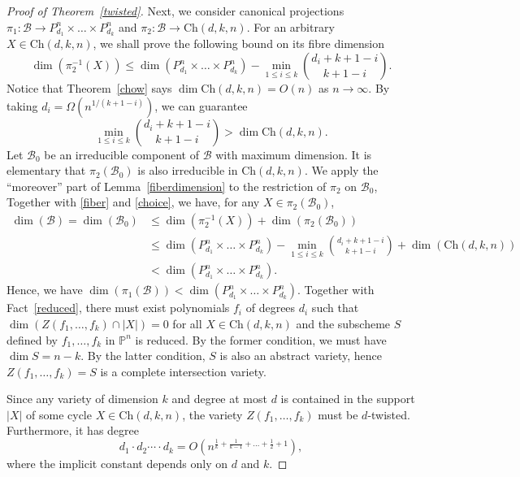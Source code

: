 \documentclass[11pt]{article}
\theoremstyle{definition}
\begin{document}
\begin{proof}[Proof of Theorem~\ref{twisted}]
    Next, we consider canonical projections $\pi_1: \mathcal{B} \to P^{n}_{d_1}\times\dots\times P^n_{d_k}$ and $\pi_2: \mathcal{B} \to \text{Ch}(d,k,n)$. For an arbitrary
    $X \in \text{Ch}(d,k,n)$, we shall prove the following bound on its fibre dimension \begin{equation}\label{fiber}
        \dim \left(\pi_2^{-1}(X)\right) \leq \dim\left( P^{n}_{d_1}\times\dots\times P^n_{d_k} \right) - \min_{1\leq i\leq k} \binom{d_i+k+1-i}{k+1-i}.
    \end{equation} Notice that Theorem~\ref{chow} says $\dim \text{Ch}(d,k,n) = O(n)$ as $n\to \infty$. By taking $d_i = \Omega\left(n^{1/(k+1-i)}\right)$, we can guarantee \begin{equation}\label{choice}
        \min_{1\leq i\leq k} \binom{d_i+k+1-i}{k+1-i} > \dim \text{Ch}(d,k,n).
    \end{equation} Let $\mathcal{B}_0$ be an irreducible component of $\mathcal{B}$ with maximum dimension. It is elementary that $\pi_2(\mathcal{B}_0)$ is also irreducible in $\text{Ch}(d,k,n)$. We apply the ``moreover'' part of Lemma~\ref{fiberdimension} to the restriction of $\pi_2$ on $\mathcal{B}_0$, Together with \eqref{fiber} and \eqref{choice}, we have, for any $X\in \pi_2(\mathcal{B}_0)$, \begin{align*}
        \dim(\mathcal{B}) = \dim(\mathcal{B}_0) &\leq \dim (\pi_2^{-1}(X))+\dim (\pi_2(\mathcal{B}_0))\\
                        &\leq \dim\left( P^{n}_{d_1}\times\dots\times P^n_{d_k} \right) - \min_{1\leq i\leq k} \binom{d_i+k+1-i}{k+1-i} + \dim (\text{Ch}(d,k,n))\\
                        &< \dim\left( P^{n}_{d_1}\times\dots\times P^n_{d_k} \right).
    \end{align*} Hence, we have $\dim\left(\pi_1(\mathcal{B})\right) < \dim ( P^{n}_{d_1}\times\dots\times P^n_{d_k} )$. Together with Fact~\ref{reduced}, there must exist polynomials $f_i$ of degrees $d_i$ such that $\dim ( Z(f_1,\dots,f_k) \cap |X| ) = 0$ for all $X \in \text{Ch}(d,k,n)$ and the subscheme $S$ defined by $f_1,\dots,f_k$ in $\mathbb{P}^n$ is reduced. By the former condition, we must have $\dim S = n - k$. By the latter condition, $S$ is also an abstract variety, hence $Z(f_1,\dots,f_k) = S$ is a complete intersection variety.
    
    Since any variety of dimension $k$ and degree at most $d$ is contained in the support $|X|$ of some cycle $X \in \text{Ch}(d,k,n)$, the variety $Z(f_1,\dots,f_k)$ must be $d$-twisted. Furthermore, it has degree \begin{equation*}
        d_1 \cdot d_2 \cdots \cdot d_k = O\left(n^{\frac{1}{k} + \frac{1}{k-1} + \dots + \frac{1}{2} + 1}\right),
    \end{equation*} where the implicit constant depends only on $d$ and $k$.


\end{proof}
\end{document}
